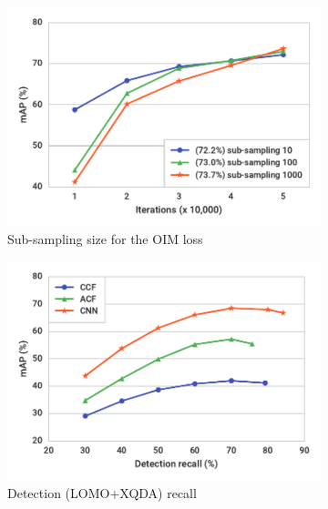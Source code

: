 \begin{figure}[t]
\begin{center}
\begin{subfigure}[t]{0.6\linewidth}
  \includegraphics[width=\linewidth]{figures/person_search/subsampling.pdf}
  \caption{Sub-sampling size for the OIM loss}
  \label{fig:ps-subsampling}
\end{subfigure}
\begin{subfigure}[t]{0.6\linewidth}
  \includegraphics[width=\linewidth]{figures/person_search/factor-recall.pdf}
  \caption{Detection (LOMO+XQDA) recall}
  \label{fig:ps-factor-recall}
\end{subfigure}
\begin{subfigure}[t]{0.6\linewidth}

\end{subfigure}
\end{center}
\end{figure}
